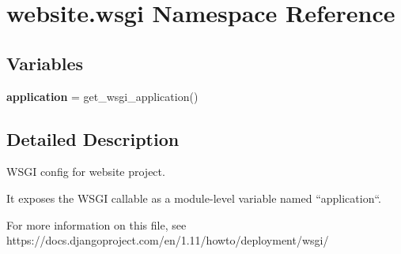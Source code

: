 \hypertarget{namespacewebsite_1_1wsgi}{}\section{website.\+wsgi Namespace Reference}
\label{namespacewebsite_1_1wsgi}
\subsection*{Variables}
\begin{DoxyCompactItemize}
\item 
\mbox{\label{namespacewebsite_1_1wsgi_af94ed25d13050abfd87b6e65a2778af4}} 
{\bfseries application} = get\+\_\+wsgi\+\_\+application()
\end{DoxyCompactItemize}


\subsection{Detailed Description}
\begin{DoxyVerb}WSGI config for website project.

It exposes the WSGI callable as a module-level variable named ``application``.

For more information on this file, see
https://docs.djangoproject.com/en/1.11/howto/deployment/wsgi/
\end{DoxyVerb}
 